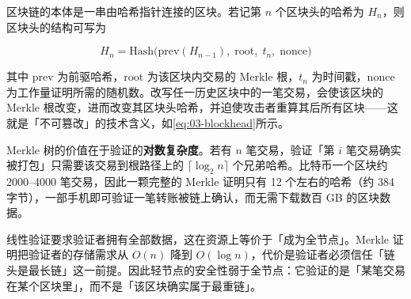 区块链的本体是一串由哈希指针连接的区块。若记第 $n$ 个区块头的哈希为 $H_n$，则区块头的结构可写为

\begin{equation}
  H_n = \mathrm{Hash}\bigl(\text{prev}(H_{n-1}),\; \text{root},\; t_n,\; \text{nonce}\bigr)
  \label{eq:03-blockhead}
\end{equation}

其中 $\text{prev}$ 为前驱哈希，$\text{root}$ 为该区块内交易的 Merkle 根，$t_n$ 为时间戳，$\text{nonce}$ 为工作量证明所需的随机数。改写任一历史区块中的一笔交易，会使该区块的 Merkle 根改变，进而改变其区块头哈希，并迫使攻击者重算其后所有区块——这就是「不可篡改」的技术含义，如\cref{eq:03-blockhead}所示。

Merkle 树的价值在于验证的\textbf{对数复杂度}。若有 $n$ 笔交易，验证「第 $i$ 笔交易确实被打包」只需要该交易到根路径上的 $\lceil \log_2 n\rceil$ 个兄弟哈希。比特币一个区块约 2000--4000 笔交易，因此一颗完整的 Merkle 证明只有 12 个左右的哈希（约 384 字节），一部手机即可验证一笔转账被链上确认，而无需下载数百 GB 的区块数据。

\begin{intuitionbox}
线性验证要求验证者拥有全部数据，这在资源上等价于「成为全节点」。Merkle 证明把验证者的存储需求从 $O(n)$ 降到 $O(\log n)$，代价是验证者必须信任「链头是最长链」这一前提。因此轻节点的安全性弱于全节点：它验证的是「某笔交易在某个区块里」，而不是「该区块确实属于最重链」。
\end{intuitionbox}

